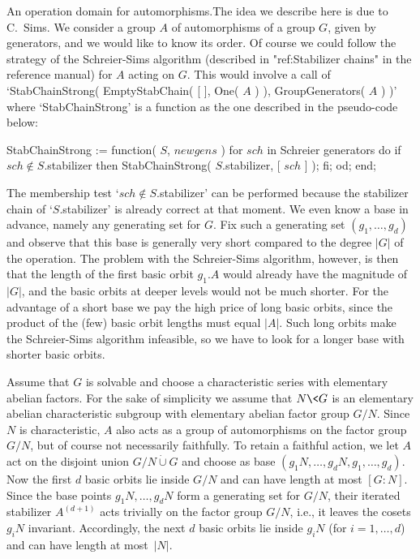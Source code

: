 {\bsf  An operation domain for automorphisms.}\quad  The idea we describe
here is due  to C.~Sims. We consider  a group $A$  of  automorphisms of a
group $G$, given by generators,  and we would like  to know its order. Of
course we  could   follow the strategy  of  the   Schreier-Sims algorithm
(described  in "ref:Stabilizer chains"  in  the reference manual) for $A$
acting   on   $G$. This would    involve   a  call  of  `StabChainStrong(
EmptyStabChain( [   ],  One( $A$ ) ),   GroupGenerators(  $A$ ) )'  where
`StabChainStrong'  is a function as the  one described in the pseudo-code
below:

\)StabChainStrong := function( $S$, $newgens$ )
\)
\)\quad for $sch$  in {\rm Schreier generators}  do
\)\qquad if $sch \notin S$.stabilizer  then
\)\qquad\quad StabChainStrong( $S$.stabilizer, [ $sch$ ] );
\)\qquad fi;
\)\quad od;
\)end;
  \vadjust{\allowbreak}%

The membership test `$sch  \notin S$.stabilizer' can be performed because
the  stabilizer chain  of `$S$.stabilizer'  is   already correct at  that
moment. We  even know a base  in advance, namely  any  generating set for
$G$. Fix such  a generating set  $(g_1,\ldots,g_d)$ and observe that this
base  is  generally very   short compared  to   the degree $|G|$  of  the
operation. The problem with the Schreier-Sims algorithm, however, is then
that the length of the first  basic orbit $g_1.A$  would already have the
magnitude of $|G|$,  and the basic orbits at  deeper levels would  not be
much shorter. For the advantage of a short base  we pay the high price of
long basic  orbits, since the  product of  the  (few) basic orbit lengths
must  equal $|A|$.  Such  long  orbits  make the Schreier-Sims  algorithm
infeasible,   so we have to   look for a  longer base  with shorter basic
orbits.

Assume that   $G$ is solvable  and  choose  a  characteristic series with
elementary abelian factors. For the sake of  simplicity we assume that $N
\< G$ is an   elementary abelian characteristic subgroup  with elementary
abelian factor group $G/N$. Since $N$ is characteristic, $A$ also acts as
a group of automorphisms  on the factor  group $G/N$,  but of course  not
necessarily  faithfully. To retain  a faithful action,  we let $A$ act on
the disjoint  union  $G/N   \mathbin{\dot\cup} G$  and  choose  as   base
$(g_1N,\ldots,g_dN,g_1,\ldots,g_d)$.  Now the first  $d$ basic orbits lie
inside $G/N$ and can have length at  most $[G\mathbin:N]$. Since the base
points  $g_1N,\ldots,  g_dN$  form a  generating   set  for  $G/N$, their
iterated stabilizer $A^{(d+1)}$ acts trivially on the factor group $G/N$,
i.e., it leaves  the cosets $g_iN$  invariant. Accordingly,  the next $d$
basic orbits lie inside  $g_iN$ (for $i=1,\ldots,d$)  and can have length
at most~$|N|$.

